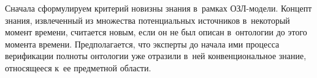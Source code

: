 {\begin{multicols}{2}
  Сначала сформулируем критерий новизны знания в~рамках ОЗЛ-мо\-де\-ли. 
Концепт знания, извлеченный из множества потенциальных источников 
в~некоторый момент времени, считается новым, если он не был описан 
в~онтологии до этого момента времени. Предполагается, что эксперты до 
начала ими процесса верификации полноты онтологии уже отразили в~ней 
конвенциональное знание, относящееся к~ее предметной области.

\begin{figure*}[b] %
\vspace*{1pt}
\begin{minipage}[t]{80mm}
 \begin{center}
 \mbox{%
 \epsfxsize=66.206mm 
 }
 \end{center}
   \vspace*{-9pt}
\end{minipage}
\hfill
\vspace*{1pt}
\begin{minipage}[t]{80mm}
 \begin{center}
 \mbox{%
 \epsfxsize=79mm 
 }
 \end{center}
   \vspace*{-9pt}
\end{minipage}
\end{figure*}
  

\end{multicols}}
